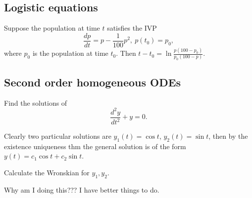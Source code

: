\subsection{Logistic equations}
\begin{example}
    Suppose the population at time $t $ satisfies the IVP \[
        \frac{dp}{dt}=p -\frac{1}{100}p^2, \ p(t_0)=p_0,
    \] where $p_0$ is the population at time $t_0$. Then $t-t_0=\ln \frac{p(100-p_0)}{p_0(100-p)}$.
\end{example}
\subsection{Second order homogeneous ODEs}
\begin{prob}
    Find the solutions of \[
   \frac{d^2y}{dt^2}+y=0.
    \] 
\end{prob}
\begin{solution}
    Clearly two particular solutions are $y_1(t)=\cos t$, $y_2(t)=\sin t$, then by the existence uniqueness thm the general solution is of the form $y(t)=c_1 \cos t+c_2 \sin t$.
\end{solution}
\begin{prob}
    Calculate the Wronskian for $y_1,y_2$.
\end{prob}
\begin{solution}
    Why am I doing this??? I have better things to do.
\end{solution}
